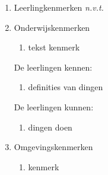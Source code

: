 
\begingroup
\Lesdoelen


\begin{frame}
    \helponderwerp
    \thelesonderwerp
    
    \begin{enumerate}
        \item{Leerlingkenmerken 
            \textit{n.v.t.}
            \helpllnken 
        }
        \item{Onderwijskenmerken \helplkrken 
            \begin{enumerate}
                \item{tekst kenmerk}
            \end{enumerate}
            
        De leerlingen kennen:
            \begin{enumerate}
                \item{definities van dingen}
            \end{enumerate}
            
        De leerlingen kunnen:
            \begin{enumerate}
                \item{dingen doen}
            \end{enumerate}
        
        }
        \item{Omgevingskenmerken \helpomgvken 
            \begin{enumerate}
                \item{kenmerk}
            \end{enumerate}
        }
    \end{enumerate}
\end{frame}

